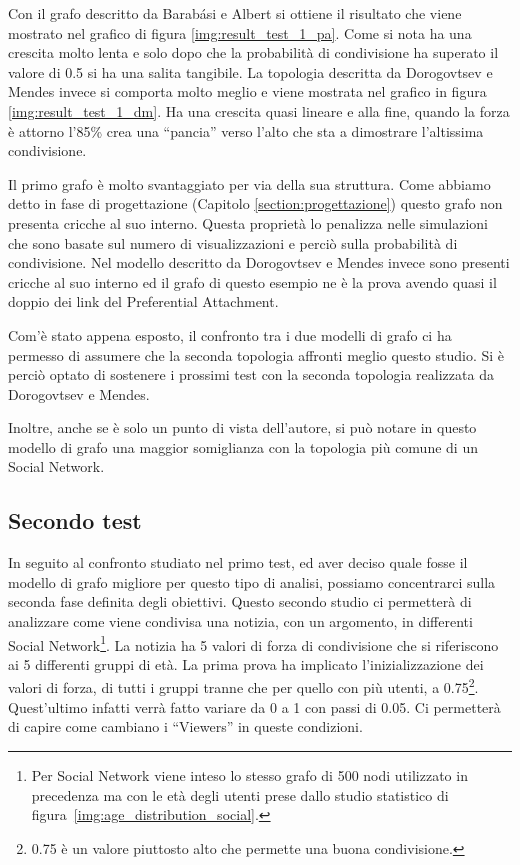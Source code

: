 Con il grafo descritto da Barabási e Albert si ottiene il risultato che viene mostrato nel grafico di figura \ref{img:result_test_1_pa}.
Come si nota ha una crescita molto lenta e solo dopo che la probabilità di condivisione ha superato il valore di 0.5 si ha una salita tangibile.
La topologia descritta da Dorogovtsev e Mendes invece si comporta molto meglio e viene mostrata nel grafico in figura \ref{img:result_test_1_dm}.
Ha una crescita quasi lineare e alla fine, quando la forza è attorno l'85\% crea una ``pancia'' verso l'alto che sta a dimostrare l'altissima 
condivisione.

Il primo grafo è molto svantaggiato per via della sua struttura. Come abbiamo detto in fase di progettazione (Capitolo \ref{section:progettazione}) 
questo grafo non presenta cricche al suo interno.
Questa proprietà lo penalizza nelle simulazioni che sono basate sul numero di visualizzazioni e perciò sulla probabilità di condivisione.
Nel modello descritto da Dorogovtsev e Mendes invece sono presenti cricche al suo interno ed il grafo di questo esempio ne è la prova
avendo quasi il doppio dei link del Preferential Attachment.

Com'è stato appena esposto, il confronto tra i due modelli di grafo ci ha permesso di assumere che la seconda topologia 
affronti meglio questo studio.
Si è perciò optato di sostenere i prossimi test con la seconda topologia realizzata da Dorogovtsev e Mendes.

Inoltre, anche se è solo un punto di vista dell'autore, si può notare in questo modello di grafo una 
maggior somiglianza con la topologia più comune di un Social Network.


\subsection{Secondo test}
\label{section:second_test}

In seguito al confronto studiato nel primo test, ed aver deciso quale fosse il modello di grafo migliore per questo tipo di analisi, 
possiamo concentrarci sulla seconda fase definita degli obiettivi.
Questo secondo studio ci permetterà di analizzare come viene condivisa una notizia, con un argomento, in differenti 
Social Network\footnote{\scriptsize Per Social Network viene inteso lo stesso grafo di 500 nodi utilizzato in precedenza 
ma con le età degli utenti prese dallo studio statistico di figura~\ref{img:age_distribution_social}.}.
La notizia ha 5 valori di forza di condivisione che si riferiscono ai 5 differenti gruppi di età. 
La prima prova ha implicato l'inizializzazione dei valori di forza, di tutti i gruppi tranne che per quello con più utenti, a
0.75\footnote{\scriptsize 0.75 è un valore piuttosto alto che permette una buona condivisione.}.
Quest'ultimo infatti verrà fatto variare da 0 a 1 con passi di 0.05.
Ci permetterà di capire come cambiano i ``Viewers'' in queste condizioni.

